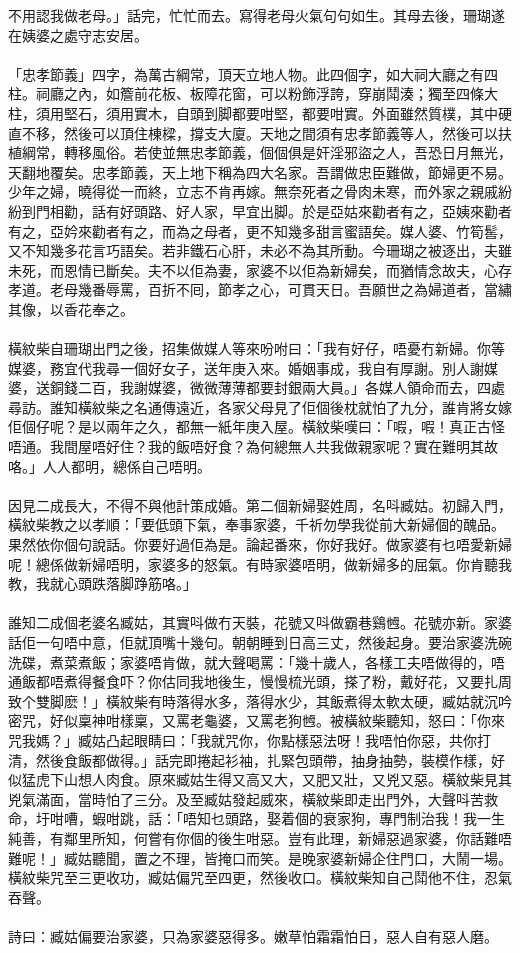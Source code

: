 \documentclass[a5paper, 10pt, openany]{book} %
\begin{document}
不用認我做老母。」話完，忙忙而去。寫得老母火氣句句如生。其母去後，珊瑚遂在姨婆之處守志安居。\\\\	「忠孝節義」四字，為萬古綱常，頂天立地人物。此四個字，如大祠大廳之有四柱。祠廳之內，如簷前花板、板障花窗，可以粉飾浮誇，穿崩鬦湊；獨至四條大柱，須用堅石，須用實木，自頭到脚都要咁堅，都要咁實。外面雖然質樸，其中硬直不移，然後可以頂住棟樑，撐支大廈。天地之間須有忠孝節義等人，然後可以扶植綱常，轉移風俗。若使並無忠孝節義，個個俱是奸淫邪盜之人，吾恐日月無光，天翻地覆矣。忠孝節義，天上地下稱為四大名家。吾謂做忠臣難做，節婦更不易。少年之婦，曉得從一而終，立志不肯再嫁。無奈死者之骨肉未寒，而外家之親戚紛紛到門相勸，話有好頭路、好人家，早宜出脚。於是亞姑來勸者有之，亞姨來勸者有之，亞妗來勸者有之，而為之母者，更不知幾多甜言蜜語矣。媒人婆、竹筍䯻，又不知幾多花言巧語矣。若非鐵石心肝，未必不為其所動。今珊瑚之被逐出，夫雖未死，而恩情已斷矣。夫不以佢為妻，家婆不以佢為新婦矣，而猶情念故夫，心存孝道。老母幾番辱罵，百折不囘，節孝之心，可貫天日。吾願世之為婦道者，當繡其像，以香花奉之。\\\\	橫紋柴自珊瑚出門之後，招集做媒人等來吩咐曰：「我有好仔，唔憂冇新婦。你等媒婆，務宜代我尋一個好女子，送年庚入來。婚姻事成，我自有厚謝。別人謝媒婆，送銅錢二百，我謝媒婆，微微薄薄都要封銀兩大員。」各媒人領命而去，四處尋訪。誰知橫紋柴之名通傳遠近，各家父母見了佢個後枕就怕了九分，誰肯將女嫁佢個仔呢？是以兩年之久，都無一紙年庚入屋。橫紋柴嘆曰：「㗇，㗇！真正古怪唔通。我間屋唔好住？我的飯唔好食？為何總無人共我做親家呢？實在難明其故咯。」人人都明，總係自己唔明。\\\\	因見二成長大，不得不與他計策成婚。第二個新婦娶姓周，名呌臧姑。初歸入門，橫紋柴教之以孝順：「要低頭下氣，奉事家婆，千祈勿學我從前大新婦個的醜品。果然依你個句說話。你要好過佢為是。論起番來，你好我好。做家婆有乜唔愛新婦呢！總係做新婦唔明，家婆多的怒氣。有時家婆唔明，做新婦多的屈氣。你肯聽我教，我就心頭跌落脚踭筋咯。」\\\\	誰知二成個老婆名臧姑，其實呌做冇天裝，花號又呌做霸巷鷄乸。花號亦新。家婆話佢一句唔中意，佢就頂嘴十幾句。朝朝睡到日高三丈，然後起身。要治家婆洗碗洗碟，煮菜煮飯；家婆唔肯做，就大聲喝罵：「幾十歲人，各樣工夫唔做得的，唔通飯都唔煮得餐食吓？你估同我地後生，慢慢梳光頭，搽了粉，戴好花，又要扎周致个雙脚麽！」橫紋柴有時落得水多，落得水少，其飯煮得太軟太硬，臧姑就沉吟密咒，好似稟神咁樣稟，又罵老龜婆，又罵老狗乸。被橫紋柴聽知，怒曰：「你來咒我媽？」臧姑凸起眼睛曰：「我就咒你，你點樣惡法呀！我唔怕你惡，共你打清，然後食飯都做得。」話完即捲起衫袖，扎緊包頭帶，抽身抽勢，裝模作樣，好似猛虎下山想人肉食。原來臧姑生得又高又大，又肥又壯，又兇又惡。橫紋柴見其兇氣滿面，當時怕了三分。及至臧姑發起威來，橫紋柴即走出門外，大聲呌苦救命，圩咁嘈，蝦咁跳，話：「唔知乜頭路，娶着個的衰家狗，專門制治我！我一生純善，有鄰里所知，何嘗有你個的後生咁惡。豈有此理，新婦惡過家婆，你話難唔難呢！」臧姑聽聞，置之不理，皆掩口而笑。是晚家婆新婦企住門口，大鬧一場。橫紋柴咒至三更收功，臧姑偏咒至四更，然後收口。橫紋柴知自己鬦他不住，忍氣吞聲。\\\\	詩曰：臧姑偏要治家婆，只為家婆惡得多。嫩草怕霜霜怕日，惡人自有惡人磨。\\\\
\end{document}
